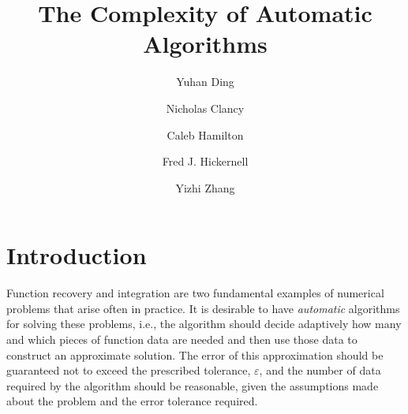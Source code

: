 \documentclass[final]{elsarticle}
\theoremstyle{definition}
\theoremstyle{remark}
\begin{document}
\begin{frontmatter}

\title{The Complexity of Automatic Algorithms}
\author{Yuhan Ding}
\author{Nicholas Clancy}
\author{Caleb Hamilton}
\author{Fred J. Hickernell}
\author{Yizhi Zhang}
\address{Room E1-208, Department of Applied Mathematics, Illinois Institute of Technology,\\ 10 W.\ 32$^{\text{nd}}$ St., Chicago, IL 60616}
\begin{abstract}
\end{abstract}

\begin{keyword}


\end{keyword}
\end{frontmatter}

\section{Introduction}
Function recovery and integration are two fundamental examples of numerical problems that arise often in practice.  It is desirable to have \emph{automatic} algorithms for solving these problems, i.e., the algorithm should decide adaptively how many and which pieces of function data are needed and then use those data to construct an approximate solution.  The error of this approximation should be guaranteed not to exceed the prescribed tolerance, $\varepsilon$, and the number of data required by the algorithm should be reasonable, given the assumptions made about the problem and the error tolerance required.
\end{document}
